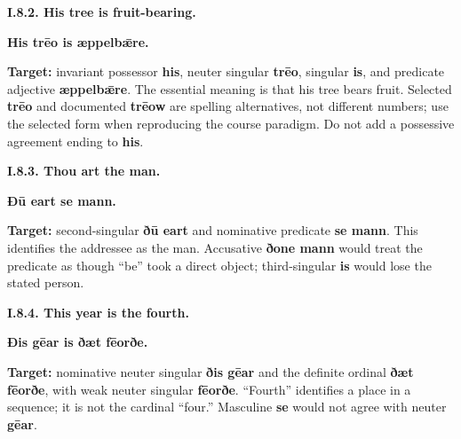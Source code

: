 \par\begin{minipage}{\linewidth}\raggedright
\textbf{I.8.2. His tree is fruit-bearing.}

\textbf{His trēo is æppelbǣre.}

\textbf{Target:} invariant possessor \textbf{his}, neuter singular \textbf{trēo}, singular \textbf{is}, and predicate adjective \textbf{æppelbǣre}. The essential meaning is that his tree bears fruit. Selected \textbf{trēo} and documented \textbf{trēow} are spelling alternatives, not different numbers; use the selected form when reproducing the course paradigm. Do not add a possessive agreement ending to \textbf{his}.

\end{minipage}\par\addvspace{4pt}

\par\begin{minipage}{\linewidth}\raggedright
\textbf{I.8.3. Thou art the man.}

\textbf{Ðū eart se mann.}

\textbf{Target:} second-singular \textbf{ðū eart} and nominative predicate \textbf{se mann}. This identifies the addressee as the man. Accusative \textbf{ðone mann} would treat the predicate as though “be” took a direct object; third-singular \textbf{is} would lose the stated person.

\end{minipage}\par\addvspace{4pt}

\par\begin{minipage}{\linewidth}\raggedright
\textbf{I.8.4. This year is the fourth.}

\textbf{Ðis gēar is ðæt fēorðe.}

\textbf{Target:} nominative neuter singular \textbf{ðis gēar} and the definite ordinal \textbf{ðæt fēorðe}, with weak neuter singular \textbf{fēorðe}. “Fourth” identifies a place in a sequence; it is not the cardinal “four.” Masculine \textbf{se} would not agree with neuter \textbf{gēar}.

\end{minipage}\par\addvspace{4pt}

